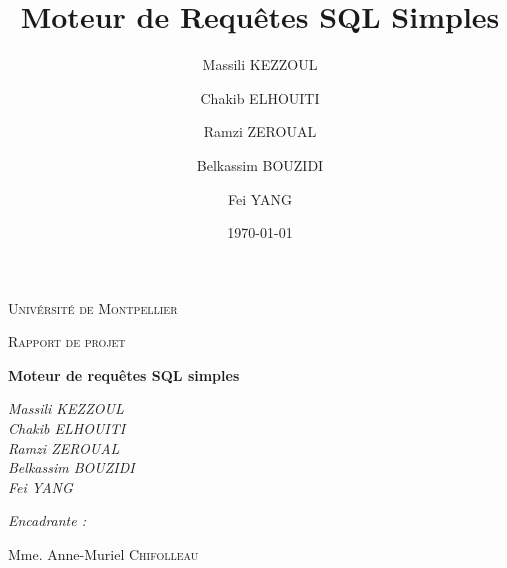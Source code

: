 \documentclass[oneside,13pt,a4paper]{report}
\title{Moteur de Requêtes SQL Simples}
\author{
    Massili KEZZOUL \and 
    Chakib ELHOUITI \and
    Ramzi ZEROUAL \and
    Belkassim BOUZIDI \and
    Fei YANG
}
\date{\today}
\begin{document}
    \begin{titlepage}
        \centering        
        \vfill
        {\scshape\LARGE Univérsité de Montpellier\par}
        {\scshape\Large Rapport de projet\par}
        \vspace{1.5cm}
        {\huge\bfseries Moteur de requêtes SQL simples\par}
        \vspace{2cm}
        {\Large\itshape 
            Massili KEZZOUL \\
            Chakib ELHOUITI \\
            Ramzi ZEROUAL \\
            Belkassim BOUZIDI \\
            Fei YANG \\
        \par}
        
        \vspace{1.5cm}

        {\Large\itshape 
            Encadrante :\par
            Mme. Anne-Muriel \textsc{Chifolleau}
        \par}
        
        \vspace{2cm}


\end{titlepage}
\end{document}
